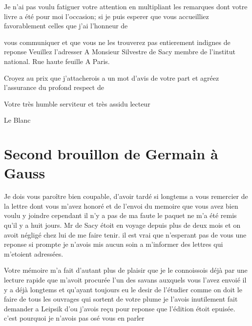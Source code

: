 \documentclass[11pt,a4paper]{article}
\begin{document}
Je n'ai pas voulu fatiguer votre attention en multipliant les remarques dont
votre livre a été pour moi l'occasion; si je puis esperer que vous
accueilliez favorablement celles que j'ai l'honneur de

vous communiquer et que vous ne  les trouverez pas
entierement indignes de reponse Veuillez l'adresser A Monsieur Silvestre de
Sacy membre de l'institut national. Rue haute feuille A Paris.

Croyez \ill{} au prix que j'attacherois a un mot d'avis de votre part et
agréez l'assurance du profond respect de

Votre très humble serviteur et très assidu lecteur

Le Blanc


\section{Second brouillon de Germain à Gauss}

Je dois vous paroître bien coupable, d'avoir tardé si longtems a vous
remercier de la lettre dont vous m'avez honoré et de l'envoi du memoire que
vous avez bien voulu y joindre cependant il n'y a pas de ma faute le paquet
ne m'a été remis qu'il y a  huit jours. Mr de Sacy étoit en
voyage depuis plus de deux mois et on avoit négligé chez lui de me faire
tenir. il est vrai que n'esperant pas de vous une reponse si prompte je
n'avois mis aucun soin a m'informer des lettres qui m'etoient adressées.


Votre mémoire m'a fait d'autant plus de plaisir que je le connoissois déjà
par une lecture rapide que m'avoit procurée l'un des savans auxquels vous
l'avez envoié il y a déjà longtems et qu'ayant toujours eu le desir de
l'étudier comme on doit le faire de tous les ouvrages qui sortent de votre
plume je l'avois inutilement fait demander a Leipsik d'ou j'avois reçu pour
reponse que l'édition étoit epuisée.    c'est pourquoi je n'avois pas osé vous
en parler
\end{document}
